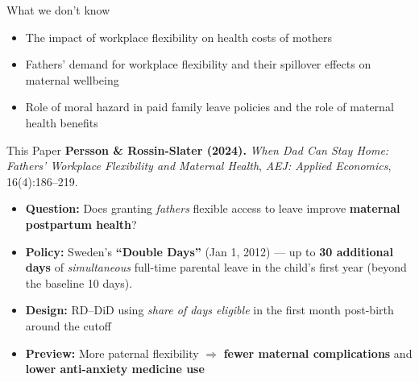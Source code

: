 \documentclass[11pt,notes=hide,aspectratio=169,mathserif]{beamer}
\begin{document}
\begin{frame}{What we don't know}
\begin{itemize}
  \item The impact of workplace flexibility on health costs of mothers
    \item Fathers' demand for workplace flexibility and their spillover effects on maternal wellbeing
    \item Role of moral hazard in paid family leave policies and the role of maternal health benefits
\end{itemize}
\end{frame}

\begin{frame}{This Paper}
\small
\textbf{Persson \& Rossin-Slater (2024).} \emph{When Dad Can Stay Home: Fathers’ Workplace Flexibility and Maternal Health}, \textit{AEJ: Applied Economics}, 16(4):186–219.\\[0.6em]
\begin{itemize}
  \item \textbf{Question:} Does granting \emph{fathers} flexible access to leave improve \textbf{maternal postpartum health}? 
  \item \textbf{Policy:} Sweden’s \textbf{“Double Days”} (Jan 1, 2012) — up to \textbf{30 additional days} of \emph{simultaneous} full-time parental leave in the child’s first year (beyond the baseline 10 days). 
  \item \textbf{Design:} RD–DiD using \emph{share of days eligible} in the first month post-birth around the cutoff
  \item \textbf{Preview:} More paternal flexibility $\Rightarrow$ \textbf{fewer maternal complications} and \textbf{lower anti-anxiety medicine use}
\end{itemize}
\end{frame}
\end{document}
